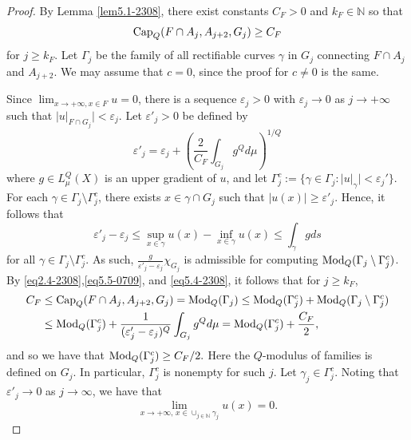 \documentclass[10pt]{amsart}
\numberwithin{equation}{section}
\begin{document}
\begin{proof}
By Lemma \ref{lem5.1-2308}, there exist  constants $C_F>0$ and $k_F\in\mathbb N$ so that
\begin{equation}\label{eq5.5-0709}
\text{\rm Cap}_Q(F\cap A_{j}, A_{j+2}, G_j)\geq C_F
\end{equation} 
for $j\ge k_F$.
Let $\Gamma_j$ be the family of all rectifiable curves $\gamma$ in $G_j$ connecting $F\cap A_j$ and $A_{j+2}$. 
We may assume that $c=0$, since the proof for $c\neq 0$ is the same.

Since $\lim_{x\to+\infty,x\in F}u=0$, there is a sequence $\varepsilon_j>0$ with $\varepsilon_j\to0$ as $j\to+\infty$ such that  $|u|_{F\cap G_j}|< \varepsilon_j$.  Let $\varepsilon'_j>0$ be defined by 
\begin{equation}\label{eq5.4-2308}
\varepsilon'_j= \varepsilon_j+\left(\frac{2}{C_F} \int_{G_j}g^Qd\mu \right)^{1/Q}
\end{equation}
where $g\in L_\mu^Q(X)$ is an upper gradient of $u$, and let
$\Gamma_j^c:=\{\gamma\in\Gamma_j:|u|_{\gamma}|<\varepsilon_j'\}$.
For each $\gamma\in \Gamma_j\setminus\Gamma_j^c$, there exists $x\in\gamma\cap G_j$ such that $|u(x)|\ge\varepsilon'_j$.  Hence, it follows that 
\[
\varepsilon'_j-\varepsilon_j\leq \sup_{x\in\gamma}u(x)-\inf_{x\in\gamma}u(x)\leq\int_\gamma gds
\]
for all $\gamma\in\Gamma_j\setminus\Gamma_j^c$.  As such, $\frac{g}{\varepsilon'_j-\varepsilon_j}\chi_{G_j}$ is admissible for computing $\text{\rm Mod}_Q(\Gamma_j\setminus\Gamma_j^c)$. 
By \eqref{eq2.4-2308},\eqref{eq5.5-0709}, and \eqref{eq5.4-2308}, it follows that for $j\ge k_F$,
\begin{align}\label{eq5.7-0709}
C_F&\leq \text{\rm Cap}_Q(F\cap A_{j}, A_{j+2},G_j)=\text{\rm Mod}_Q(\Gamma_j)\leq\text{\rm Mod}_Q(\Gamma_j^c)+\text{\rm Mod}_Q(\Gamma_j\setminus\Gamma_j^c)\nonumber\\   
    &\le\text{\rm Mod}_Q(\Gamma_j^c)+\frac{1}{(\varepsilon'_j-\varepsilon_j)^Q}\int_{G_j}g^Qd\mu=\text{\rm Mod}_Q(\Gamma_j^c)+\frac{C_F}{2},
\end{align}
  and so we have that $
    \text{\rm Mod}_Q(\Gamma_j^c)\ge C_F/2.$ Here the $Q$-modulus of families is defined on $G_j$.
 In particular, $\Gamma_j^c$ is nonempty for such $j$.
Let $\gamma_j\in\Gamma_j^c$.  Noting that $\varepsilon'_j\to 0$ as $j\to\infty$, we have that
\[
\lim_{x\to+\infty,\,x\in\cup_{j\in\mathbb{N}}\gamma_j}u(x)=0.
\]


\end{proof}
\end{document}
